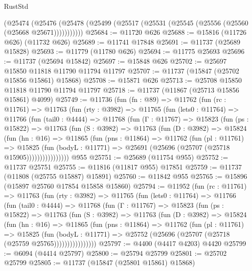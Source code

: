 \begin{lexlean}{RustStd}
\begin{coremodule}
      (@25474
        (@25476 (@25478 (@25499 (@25517 (@25531 (@25545 (@25556 (@25560 (@25668 @25671)))))))))))
@25684 := @11720 @626
@25688 := @15816 (@11726 @626) (@11732 @626)
@25689 := @11741 @17848
@25691 := @11737 (@25689 @15828)
@25693 := @11779 (@11780 @626)
@25694 := @11775 @25693
@25696 := @11737 (@25694 @15842)
@25697 := @15848 @626
@25702 := @25697 @15850 @11818 @11790 @11794 @11797
@25707 := @11737 (@15847 (@25702 @15856 @15861) @15868)
@25708 := @15871 @626
@25713 := @25708 @15850 @11818 @11790 @11794 @11797
@25718 := @11737 (@11867 (@25713 @15856 @15861) @4099)
@25749 := @11736
    (fun (fn : @89) =>
    @11762
      (fun (rc : @11761) =>
      @11763
        (fun (rty : @3982) =>
        @11765
          (fun (lets0 : @11764) =>
          @11766
            (fun (tail0 : @4444) =>
            @11768
              (fun (Γ : @11767) =>
              @15823
                (fun (ps : @15822) =>
                @11763
                  (fun (S : @3982) =>
                  @11763
                    (fun (D : @3982) =>
                    @15824
                      (fun (hn : @16) =>
                      @11865
                        (fun (pns : @11864) =>
                        @11762
                          (fun (pl : @11761) =>
                          @15825
                            (fun (bodyL : @11771) =>
                            @25691 (@25696 (@25707 (@25718 @15905))))))))))))))))
    @955
@25751 := @25689 (@11754 @955)
@25752 := @11737 @25751
@25755 := @11816 (@11817 @955) @17851
@25759 := @11737 (@11808 (@25755 @15887) @15891)
@25760 := @11842 @955
@25765 := @15896 (@15897 @25760 @17854 @15858 @15860)
@25794 := @11952
    (fun (rc : @11761) =>
    @11763
      (fun (rty : @3982) =>
      @11765
        (fun (lets0 : @11764) =>
        @11766
          (fun (tail0 : @4444) =>
          @11768
            (fun (Γ : @11767) =>
            @15823
              (fun (ps : @15822) =>
              @11763
                (fun (S : @3982) =>
                @11763
                  (fun (D : @3982) =>
                  @15824
                    (fun (hn : @16) =>
                    @11865
                      (fun (pns : @11864) =>
                      @11762
                        (fun (pl : @11761) =>
                        @15825
                          (fun (bodyL : @11771) =>
                          @25752 (@25696 (@25707 (@25718 (@25759 @25765))))))))))))))))
@25797 := @4400 (@4417 @4203) @4420
@25799 := @6094 (@4414 @25797)
@25800 := @25794 @25799
@25801 := @25702 @25799
@25805 := @11737 (@15847 (@25801 @15861) @15868)

\end{coremodule}
\end{lexlean}
